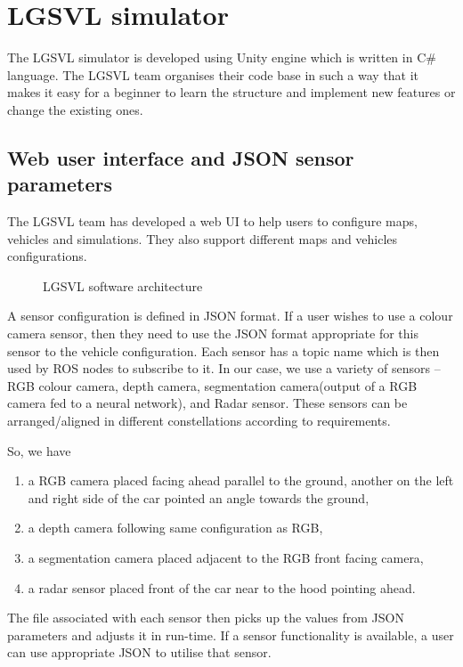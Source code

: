 \section{LGSVL simulator}
The LGSVL simulator is developed using Unity engine which is written in C\# language.
The LGSVL team organises their code base\cite{lgsvlgithub} in such a way that it makes it
easy for a beginner to learn the structure and implement new features or change the
existing ones.
\subsection{Web user interface and JSON sensor parameters}
The LGSVL team has developed a web UI to help users to configure maps, vehicles and
simulations. They also support different maps and vehicles configurations.
\begin{figure}
	\centering
    \def\svgwidth{0.7\textwidth}
    \caption{LGSVL software architecture}
    \label{fig:lgsvlswarchitecture}
\end{figure}
A sensor configuration is defined in JSON format. If a user wishes to use a colour camera
sensor, then they need to use the JSON format appropriate for this sensor to the vehicle
configuration. Each sensor has a topic name which is then used by ROS nodes to subscribe
to it. In our case, we use a variety of sensors -- RGB colour camera, depth camera,
segmentation camera(output of a RGB camera fed to a neural network), and Radar sensor.
These sensors can be arranged/aligned in different constellations according to
requirements.

So, we have

\begin{enumerate}

    \item a RGB camera placed facing ahead parallel to the ground, another on
the left and right side of the car pointed an angle towards the ground,
    \item a depth camera following same configuration as RGB,
    \item a segmentation camera placed adjacent to the RGB front facing camera,
    \item a radar sensor placed front of the car near to the hood pointing ahead.
\end{enumerate}

The file associated with each sensor then picks up the values from JSON parameters and adjusts it in
run-time. If a sensor functionality is available, a user can use appropriate JSON to
utilise that sensor.


